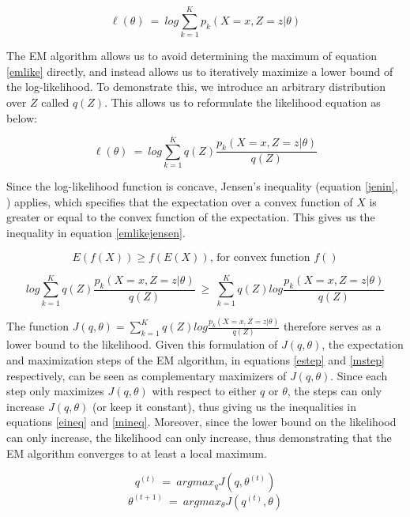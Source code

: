 \documentclass[10pt]{olplainarticle}\usepackage[]{graphicx}\usepackage[]{color}
\begin{document}
\begin{equation} \label{emlike}
   \ell(\theta) \ =\ log \sum_{k=1}^{K} p_k(X=x, Z=z | \theta)
\end{equation}

The EM algorithm allows us to avoid determining the maximum of equation \ref{emlike} directly, and instead allows us to iteratively maximize a lower bound of the log-likelihood. To demonstrate this, we introduce an arbitrary distribution over $Z$ called $q(Z)$. This allows us to reformulate the likelihood equation as below:

\begin{equation} \label{emlikeqz}
   \ell(\theta) \ =\ log \sum_{k=1}^{K}q(Z) \frac{p_k(X=x, Z=z | \theta)}{q(Z)}
\end{equation}

Since the log-likelihood function is concave, Jensen's inequality (equation \ref{jenin}, \cite{jensen}) applies, which specifies that the expectation over a convex function of $X$ is greater or equal to the convex function of the expectation. This gives us the inequality in equation \ref{emlikejensen}.

\begin{equation} \label{jenin}
   E(f(X)) \geq f(E(X)) \text{, for convex function $f()$}
\end{equation}

\begin{equation} \label{emlikejensen}
   log \sum_{k=1}^{K}q(Z) \frac{p_k(X=x, Z=z | \theta)}{q(Z)} \ \geq\ \sum_{k=1}^{K}q(Z) log \frac{p_k(X=x, Z=z | \theta)}{q(Z)}
\end{equation}

The function $J(q, \theta) = \sum_{k=1}^{K}q(Z) log \frac{p_k(X=x, Z=z | \theta)}{q(Z)}$ therefore serves as a lower bound to the likelihood. Given this formulation of $J(q, \theta)$, the expectation and maximization steps of the EM algorithm, in equations \ref{estep} and \ref{mstep} respectively, can be seen as complementary maximizers of $J(q, \theta)$. Since each step only maximizes $J(q, \theta)$ with respect to either $q$ or $\theta$, the steps can only increase $J(q, \theta)$ (or keep it constant), thus giving us the inequalities in equations \ref{eineq} and \ref{mineq}. Moreover, since the lower bound on the likelihood can only increase, the likelihood can only increase, thus demonstrating that the EM algorithm converges to at least a local maximum.

\begin{equation} \label{estep}
   q^{(t)} \ = \ argmax_q J(q, \theta^{(t)})
\end{equation}
\begin{equation} \label{mstep}
   \theta^{(t+1)} \ = \ argmax_{\theta} J(q^{(t)}, \theta)
\end{equation}
\end{document}
